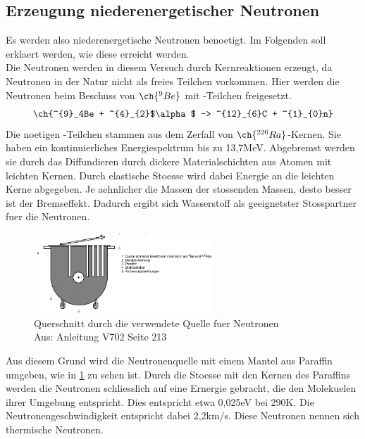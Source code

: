 \documentclass[titlepage=firstcover, captions=tableheading]{scrartcl}
\let\ce\ch
\begin{document}
\subsection{Erzeugung niederenergetischer Neutronen}
Es werden also niederenergetische Neutronen benoetigt. Im Folgenden soll erklaert werden, wie diese erreicht werden.\\
Die Neutronen werden in diesem Versuch durch Kernreaktionen erzeugt, da Neutronen in der Natur nicht als freies Teilchen vorkommen. Hier werden die Neutronen beim Beschuss von $\ce{^{9}Be}$ mit \alpha-Teilchen freigesetzt.
\begin{equation}
    \ce{^{9}_4Be + ^{4}_{2}$\alpha$ -> ^{12}_{6}C + ^{1}_{0}n} \nonumber
\end{equation}
Die noetigen \alpha-Teilchen stammen aus dem Zerfall von $ \ce{^{226}Ra}$-Kernen. Sie haben ein kontinuierliches Energiespektrum bis zu 13,7MeV. Abgebremst werden sie durch das Diffundieren durch dickere Materialschichten aus Atomen mit leichten Kernen. Durch elastische Stoesse wird dabei Energie an die leichten Kerne abgegeben. Je aehnlicher die Massen der stossenden Massen, desto besser ist der Bremseffekt. Dadurch ergibt sich Wasserstoff als geeignetster Stosspartner fuer die Neutronen. 
\begin{figure}[H]
    \centering
    \includegraphics[width=0.6\textwidth]{"Quelle_Neutronen.png"}
    \caption{Querschnitt durch die verwendete Quelle fuer Neutronen\\Aus: Anleitung V702 Seite 213}
    \label{Fig:Quelle}
\end{figure}
Aus diesem Grund wird die Neutronenquelle mit einem Mantel aus Paraffin umgeben, wie in \ref{Fig:Quelle} zu sehen ist. Durch die Stoesse mit den Kernen des Paraffins werden die Neutronen schliesslich auf eine Ernergie gebracht, die den Molekuelen ihrer Umgebung entspricht. Dies entspricht etwa 0,025eV bei 290K. Die Neutronengeschwindigkeit entspricht dabei 2,2km/s. Diese Neutronen nennen sich thermische Neutronen.
\end{document}
